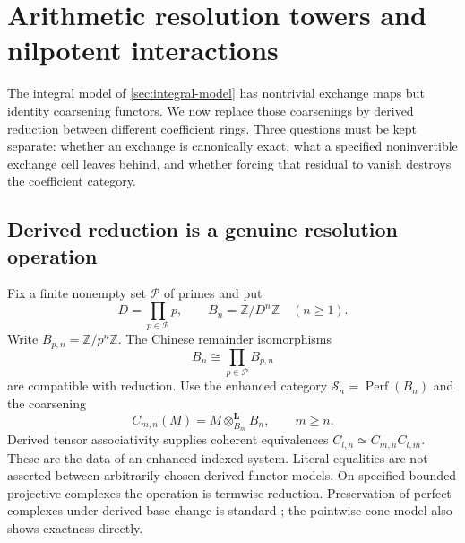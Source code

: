 \section{Arithmetic resolution towers and nilpotent interactions}\label{sec:arithmetic-towers}

The integral model of \cref{sec:integral-model} has nontrivial exchange maps but identity coarsening functors. We now replace those coarsenings by derived reduction between different coefficient rings. Three questions must be kept separate: whether an exchange is canonically exact, what a specified noninvertible exchange cell leaves behind, and whether forcing that residual to vanish destroys the coefficient category.

\subsection{Derived reduction is a genuine resolution operation}

Fix a finite nonempty set $\mathcal P$ of primes and put
\[
 D=\prod_{p\in\mathcal P}p,\qquad B_n=\mathbb Z/D^n\mathbb Z\quad(n\geq1).
\]
Write $B_{p,n}=\mathbb Z/p^n\mathbb Z$. The Chinese remainder isomorphisms
\[
 B_n\cong\prod_{p\in\mathcal P}B_{p,n}
\]
are compatible with reduction. Use the enhanced category $\mathcal S_n=\operatorname{Perf}(B_n)$ and the coarsening
\[
 C_{m,n}(M)=M\otimes^{\mathbf L}_{B_m}B_n,\qquad m\geq n.
\]
Derived tensor associativity supplies coherent equivalences $C_{l,n}\simeq C_{m,n}C_{l,m}$. These are the data of an enhanced indexed system. Literal equalities are not asserted between arbitrarily chosen derived-functor models. On specified bounded projective complexes the operation is termwise reduction. Preservation of perfect complexes under derived base change is standard \cite{StacksPerfect}; the pointwise cone model also shows exactness directly.

